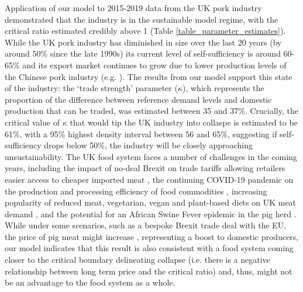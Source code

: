 \documentclass[12pt]{article}
\begin{document}
Application of our model to 2015-2019 data from the UK pork industry demonstrated that the industry is in the sustainable model regime, with the critical ratio estimated credibly above 1 (Table \ref{table_parameter_estimates}). While the UK pork industry has diminished in size over the last 20 years (by around 50\% since the late 1990s) its current level of self-sufficiency is around 60-65\% and its export market continues to grow due to lower production levels of the Chinese pork industry (e.g. \cite{AHDBexports2020}). The results from our model support this state of the industry: the `trade strength' parameter ($\kappa$), which represents the proportion of the difference between reference demand levels and domestic production that can be traded, was estimated between 35 and 37\%. Crucially, the critical value of $\kappa$ that would tip the UK industry into collaspe is estimated to be 61\%, with a 95\% highest density interval between 56 and 65\%, suggesting if self-sufficiency drops below 50\%, the industry will be closely approaching unsustainability. The UK food system faces a number of challenges in the coming years, including the impact of no-deal Brexit on trade tariffs allowing retailers easier access to cheaper imported meat \cite{feng2017}, the continuing COVID-19 pandemic on the production and processing efficiency of food commodities \cite{power2020}, increasing popularity of reduced meat, vegetarian, vegan and plant-based diets on UK meat demand \cite{james2020}, and the potential for an African Swine Fever epidemic in the pig herd \cite{normile2019,mason2020}. While under some scenarios, such as a bespoke Brexit trade deal with the EU, the price of pig meat might increase \cite{feng2017}, representing a boost to domestic producers, our model indicates that this result is also consistent with a food system coming closer to the critical boundary delineating collapse (i.e. there is a negative relationship between long term price and the critical ratio) and, thus, might not be an advantage to the food system as a whole.
\end{document}
